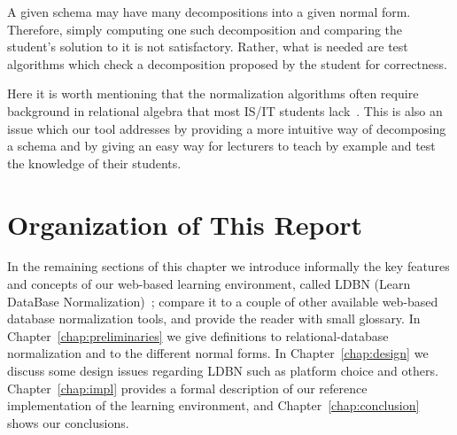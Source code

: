 A given schema may have many decompositions into a given normal form.
Therefore, simply computing one such decomposition and comparing the
student's solution to it is not satisfactory.  Rather, what is needed
are test algorithms which check a decomposition proposed by the student for
correctness.

Here it is worth mentioning that the normalization algorithms often require 
background in relational algebra that most IS/IT students lack~\cite{p8}. This
is also an issue which our tool addresses by providing a more intuitive 
way of decomposing a schema and by giving an easy way for lecturers to
teach by example and test the knowledge of their students. 

\section{Organization of This Report}
\label{sec:organization}
In the remaining sections of this chapter we introduce informally 
the key features and concepts of our web-based learning environment, 
called LDBN (Learn DataBase Normalization)~\cite{wldbn}; 
compare it to a couple of other 
available web-based database normalization tools, and provide the reader with small glossary.  
In Chapter~\ref{chap:preliminaries} we give definitions to
relational-database normalization and to the different normal forms. 
In Chapter~\ref{chap:design} we discuss some design issues regarding LDBN such as 
platform choice and others. Chapter~\ref{chap:impl} provides a formal description
of our reference implementation of the learning environment, and
Chapter~\ref{chap:conclusion} shows our conclusions.

